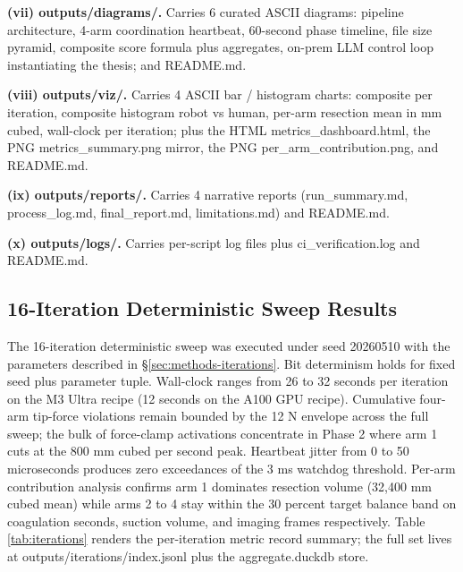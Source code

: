 \textbf{(vii) outputs/diagrams/.} Carries 6 curated ASCII diagrams:
pipeline architecture, 4-arm coordination heartbeat, 60-second phase
timeline, file size pyramid, composite score formula plus aggregates,
on-prem LLM control loop instantiating the thesis; and README.md.

\textbf{(viii) outputs/viz/.} Carries 4 ASCII bar / histogram
charts: composite per iteration, composite histogram robot vs human,
per-arm resection mean in mm cubed, wall-clock per iteration; plus
the HTML metrics_dashboard.html, the PNG metrics_summary.png mirror,
the PNG per_arm_contribution.png, and README.md.

\textbf{(ix) outputs/reports/.} Carries 4 narrative reports
(run_summary.md, process_log.md, final_report.md, limitations.md)
and README.md.

\textbf{(x) outputs/logs/.} Carries per-script log files plus
ci_verification.log and README.md.

\subsection{16-Iteration Deterministic Sweep Results}
\label{sec:results-iterations}

The 16-iteration deterministic sweep was executed under seed
20260510 with the parameters described in
\S\ref{sec:methods-iterations}. Bit determinism holds for fixed seed
plus parameter tuple. Wall-clock ranges from 26 to 32 seconds per
iteration on the M3 Ultra recipe (12 seconds on the A100 GPU recipe).
Cumulative four-arm tip-force violations remain bounded by the 12 N
envelope across the full sweep; the bulk of force-clamp activations
concentrate in Phase 2 where arm 1 cuts at the 800 mm cubed per
second peak. Heartbeat jitter from 0 to 50 microseconds produces
zero exceedances of the 3 ms watchdog threshold. Per-arm contribution
analysis confirms arm 1 dominates resection volume (32,400 mm cubed
mean) while arms 2 to 4 stay within the 30 percent target balance
band on coagulation seconds, suction volume, and imaging frames
respectively. Table \ref{tab:iterations} renders the per-iteration
metric record summary; the full set lives at
outputs/iterations/index.jsonl plus the aggregate.duckdb store.


